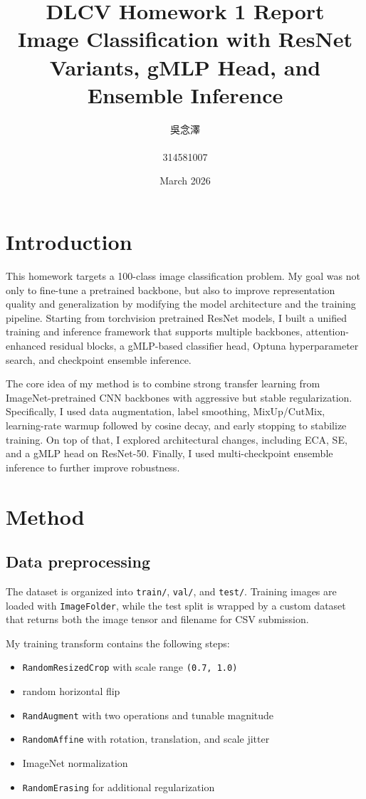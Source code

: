 \documentclass[11pt]{article}
\title{\vspace{-1.2cm}DLCV Homework 1 Report\\Image Classification with ResNet Variants, gMLP Head, and Ensemble Inference}
\author{吳念澤\\\\314581007}
\date{March 2026}
\begin{document}
\maketitle
\vspace{-1.2em}

\section{Introduction}
This homework targets a 100-class image classification problem. My goal was not only to fine-tune a pretrained backbone, but also to improve representation quality and generalization by modifying the model architecture and the training pipeline. Starting from torchvision pretrained ResNet models, I built a unified training and inference framework that supports multiple backbones, attention-enhanced residual blocks, a gMLP-based classifier head, Optuna hyperparameter search, and checkpoint ensemble inference.

The core idea of my method is to combine strong transfer learning from ImageNet-pretrained CNN backbones with aggressive but stable regularization. Specifically, I used data augmentation, label smoothing, MixUp/CutMix, learning-rate warmup followed by cosine decay, and early stopping to stabilize training. On top of that, I explored architectural changes, including ECA, SE, and a gMLP head on ResNet-50. Finally, I used multi-checkpoint ensemble inference to further improve robustness.

\section{Method}
\subsection{Data preprocessing}
The dataset is organized into \texttt{train/}, \texttt{val/}, and \texttt{test/}. Training images are loaded with \texttt{ImageFolder}, while the test split is wrapped by a custom dataset that returns both the image tensor and filename for CSV submission.

My training transform contains the following steps:
\begin{itemize}[leftmargin=1.5em]
\item \texttt{RandomResizedCrop} with scale range \texttt{(0.7, 1.0)}
\item random horizontal flip
\item \texttt{RandAugment} with two operations and tunable magnitude
\item \texttt{RandomAffine} with rotation, translation, and scale jitter
\item ImageNet normalization
\item \texttt{RandomErasing} for additional regularization
\end{itemize}
\end{document}
